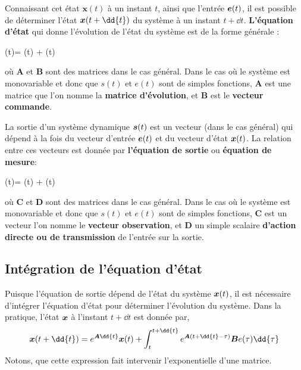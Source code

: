 Connaissant cet état $\boldsymbol{x}(t)$ à un instant $t$, ainsi que l'entrée 
$\boldsymbol{e} (t)$, il est possible de déterminer l'état $\bdx(t+\dd{t})$ du système 
à un instant $t+\dd{t}$. \textbf{L'équation d'état} 
qui donne l'évolution de l'état du système est de la forme générale :
\begin{bequation}
    (t)= \bdx (t) +  \bde (t)
    \label{eq-etat}
\end{bequation}
où $\boldsymbol{A}$ et $\boldsymbol{B}$ sont des matrices dans le cas
général.
Dans le cas où le système est monovariable et donc que $s(t)$ et $e(t)$ sont
de simples fonctions, $\boldsymbol{A}$ est une matrice que l'on nomme la 
\textbf{matrice d'évolution}, et $\boldsymbol{B}$ est le 
\textbf{vecteur commande}.

La sortie d'un système dynamique $\boldsymbol{s}(t)$ est un vecteur (dans le cas général) 
qui dépend à la fois du vecteur d'entrée $\boldsymbol{e} (t)$ et du vecteur d'état 
$\boldsymbol{x} (t)$. La relation entre ces vecteurs est donnée par 
\textbf{l'équation de sortie} ou \textbf{équation de mesure}:
\begin{bequation}
    \bds (t)= \bdx (t) +  \bde (t)
    \label{eq-sortie}
\end{bequation}
où $\boldsymbol{C}$ et $\boldsymbol{D}$ sont des matrices dans le cas
général.
Dans le cas où le système est monovariable et donc que $s(t)$ et $e(t)$ sont
de simples fonctions, $\boldsymbol{C}$ est un vecteur l'on nomme le 
\textbf{vecteur observation}, et $\boldsymbol{D}$ un simple scalaire 
\textbf{d'action directe ou de transmission} de l'entrée sur la sortie.
\clearpage
\subsection{Intégration de l'équation d'état}
Puisque l'équation de sortie dépend de l'état du système $\boldsymbol{x}(t)$,
il est nécessaire d'intégrer l'équation d'état pour déterminer l'évolution 
du système. 
Dans la pratique, l'état $\boldsymbol{x}$ à l'instant $t+\dd{t}$ est donnée par, 
\[
    \bdx(t+\dd{t})=
    e^{\boldsymbol{A}\dd{t}}\bdx(t)+
    \int_t^{t+\dd{t}}e^{\boldsymbol{A}(t+\dd{t}-\tau)}
    \boldsymbol{B}e(\tau)\dd{\tau}
\]
Notons, que cette expression fait intervenir l'exponentielle d'une matrice.
